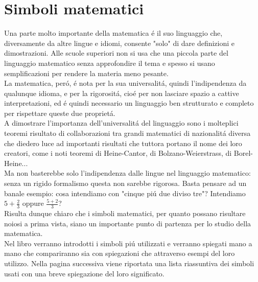 \documentclass[twoside]{article} %
\newcommand{\blankpage}{\null\thispagestyle{empty}\addtocounter{page}{-1}\newpage}
\begin{document}
	\newpage
	
	\addtocounter{page}{1}
	\tableofcontents	%
	\thispagestyle{indice}	%
	
	\afterpage{\blankpage}%
	\newpage
	
	\setcounter{page}{1}
	\section{Simboli matematici}
	Una parte molto importante della matematica \'e il suo linguaggio che, diversamente da altre lingue e idiomi, consente "solo" di dare definizioni e dimostrazioni. Alle scuole superiori non si usa che una piccola parte del linguaggio matematico senza approfondire il tema e spesso si usano semplificazioni per rendere la materia meno pesante.\\
	La matematica, per\'o, \'e nota per la sua universalit\'a, quindi l'indipendenza da qualunque idioma, e per la rigorosit\'a, cio\'e per non lasciare spazio a cattive interpretazioni, ed \'e quindi necessario un linguaggio ben strutturato e completo per rispettare queste due propriet\'a.\\
	A dimostrare l'importanza dell'universalit\'a del linguaggio sono i molteplici teoremi risultato di collaborazioni tra grandi matematici di nazionalit\'a diversa che diedero luce ad importanti risultati che tuttora portano il nome dei loro creatori, come i noti teoremi di Heine-Cantor, di Bolzano-Weierstrass, di Borel-Heine... \\
	Ma non basterebbe solo l'indipendenza dalle lingue nel linguaggio matematico: senza un rigido formalismo questa non sarebbe rigorosa. Basta pensare ad un banale esempio: cosa intendiamo con "cinque pi\'u due diviso tre"? Intendiamo $5+\frac{2}{3}$ oppure $\frac{5+2}{3}$?\\
	Risulta dunque chiaro che i simboli matematici, per quanto possano risultare noiosi a prima vista, siano un importante punto di partenza per lo studio della matematica.\\
	Nel libro verranno introdotti i simboli pi\'u utilizzati e verranno spiegati mano a mano che compariranno sia con spiegazioni che attraverso esempi del loro utilizzo. Nella pagina successiva viene riportata una lista riassuntiva dei simboli usati con una breve spiegazione del loro significato.		
\newpage
\end{document}
